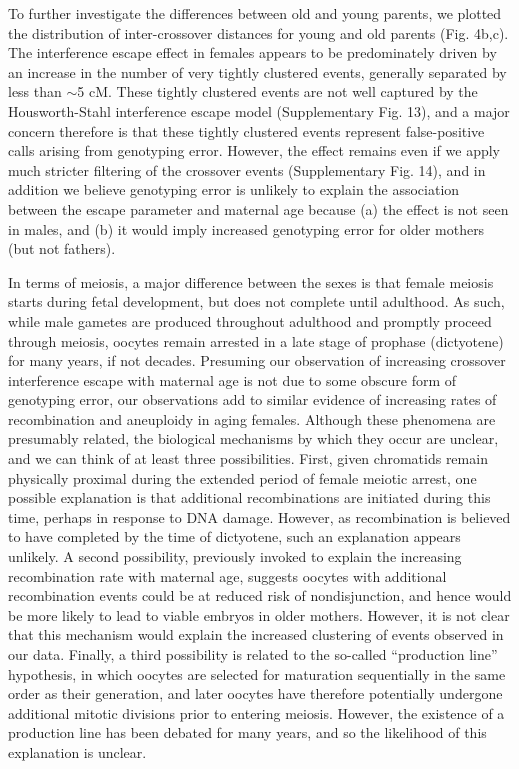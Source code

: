 To further investigate the differences between old and young
parents, we plotted the distribution of inter-crossover distances
for young and old parents (Fig. 4b,c). The interference escape
effect in females appears to be predominately driven by an
increase in the number of very tightly clustered events, generally
separated by less than $\sim$5 cM. These tightly clustered events are
not well captured by the Housworth-Stahl interference escape
model (Supplementary Fig. 13), and a major concern therefore is
that these tightly clustered events represent false-positive calls
arising from genotyping error. However, the effect remains even
if we apply much stricter filtering of the crossover events
(Supplementary Fig. 14), and in addition we believe genotyping
error is unlikely to explain the association between the escape
parameter and maternal age because (a) the effect is not seen in
males, and (b) it would imply increased genotyping error for
older mothers (but not fathers).

In terms of meiosis, a major difference between the sexes is that
female meiosis starts during fetal development, but does not
complete until adulthood. As such, while male gametes are
produced throughout adulthood and promptly proceed through
meiosis, oocytes remain arrested in a late stage of prophase
(dictyotene) for many years, if not decades. Presuming our
observation of increasing crossover interference escape with
maternal age is not due to some obscure form of genotyping
error, our observations add to similar evidence of increasing rates
of recombination\cite{Kong2004} and aneuploidy\cite{Hassold2001} in aging females. Although
these phenomena are presumably related, the biological
mechanisms by which they occur are unclear, and we can think
of at least three possibilities. First, given chromatids remain
physically proximal during the extended period of female meiotic
arrest, one possible explanation is that additional recombinations
are initiated during this time, perhaps in response to
DNA damage. However, as recombination is believed to have
completed by the time of dictyotene, such an explanation appears
unlikely. A second possibility, previously invoked to explain the
increasing recombination rate with maternal age\cite{Kong2004}, suggests
oocytes with additional recombination events could be at
reduced risk of nondisjunction, and hence would be more likely
to lead to viable embryos in older mothers. However, it is not
clear that this mechanism would explain the increased clustering
of events observed in our data. Finally, a third possibility is 
related to the so-called ``production line'' hypothesis, in which
oocytes are selected for maturation sequentially in the same order
as their generation, and later oocytes have therefore potentially
undergone additional mitotic divisions prior to entering
meiosis\cite{Reizel2012}. However, the existence of a production line has been
debated for many years\cite{Reizel2012,Polani1991,Rowsey2014}, and so the likelihood of this
explanation is unclear.

